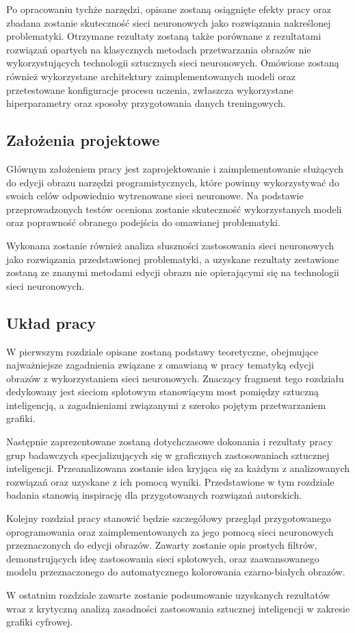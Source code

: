     Po opracowaniu tychże narzędzi, opisane zostaną osiągnięte efekty pracy oraz
    zbadana zostanie skuteczność sieci neuronowych jako rozwiązania nakreślonej
    problematyki. Otrzymane rezultaty zostaną także porównane z rezultatami
    rozwiązań opartych na klasycznych metodach przetwarzania obrazów nie
    wykorzystujących technologii sztucznych sieci neuronowych.
    Omówione zostaną również wykorzystane architektury zaimplementowanych
    modeli oraz przetestowane konfiguracje procesu uczenia, zwłaszcza wykorzystane
    hiperparametry oraz sposoby przygotowania danych treningowych.

  \subsection{Założenia projektowe}

    Głównym założeniem pracy jest zaprojektowanie i zaimplementowanie
    służących do edycji obrazu narzędzi programistycznych, które powinny
    wykorzystywać do swoich celów odpowiednio wytrenowane sieci neuronowe.
    Na podstawie przeprowadzonych testów oceniona zostanie skuteczność
    wykorzystanych modeli oraz poprawność obranego podejścia do
    omawianej problematyki.

    Wykonana zostanie również analiza słuszności zastosowania sieci
    neuronowych jako rozwiązania przedstawionej problematyki, a uzyskane
    rezultaty zestawione zostaną ze znanymi metodami edycji
    obrazu nie opierającymi się na technologii sieci neuronowych.

  \subsection{Układ pracy}

    W pierwszym rozdziale opisane zostaną podstawy teoretyczne, obejmujące najważniejsze
    zagadnienia związane z omawianą w pracy tematyką edycji obrazów z
    wykorzystaniem sieci neuronowych. Znaczący fragment tego rozdziału dedykowany
    jest sieciom splotowym stanowiącym most pomiędzy sztuczną
    inteligencją, a zagadnieniami związanymi z szeroko pojętym przetwarzaniem
    grafiki.

    Następnie zaprezentowane zostaną dotychczasowe dokonania i rezultaty pracy
    grup badawczych specjalizujących się w graficznych zastosowaniach sztucznej
    inteligencji.
    Przeanalizowana zostanie idea kryjąca się za każdym z analizowanych
    rozwiązań oraz uzyskane z ich pomocą wyniki.
    Przedstawione w tym rozdziale badania stanowią inspirację dla przygotowanych
    rozwiązań autorskich.

    Kolejny rozdział pracy stanowić będzie szczegółowy przegląd przygotowanego
    oprogramowania oraz zaimplementowanych za jego pomocą sieci neuronowych
    przeznaczonych do edycji obrazów. Zawarty zostanie opis prostych filtrów,
    demonstrujących ideę zastosowania sieci splotowych, oraz zaawansowanego
    modelu przeznaczonego do automatycznego kolorowania czarno-białych obrazów.

    W ostatnim rozdziale zawarte zostanie podsumowanie uzyskanych rezultatów wraz
    z krytyczną analizą zasadności zastosowania sztucznej inteligencji w
    zakresie grafiki cyfrowej.
